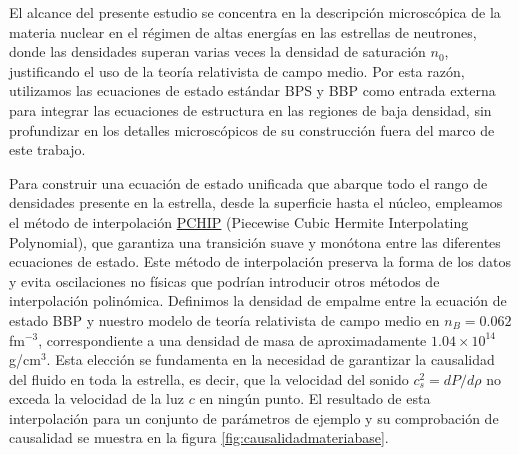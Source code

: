 El alcance del presente estudio se concentra en la descripción microscópica de la materia nuclear en el régimen de altas energías en las estrellas de neutrones, donde las densidades superan varias veces la densidad de saturación $n_0$, justificando el uso de la teoría relativista de campo medio. Por esta razón, utilizamos las ecuaciones de estado estándar BPS y BBP como entrada externa para integrar las ecuaciones de estructura en las regiones de baja densidad, sin profundizar en los detalles microscópicos de su construcción fuera del marco de este trabajo.

Para construir una ecuación de estado unificada que abarque todo el rango de densidades presente en la estrella, desde la superficie hasta el núcleo, empleamos el método de interpolación \href{https://es.wikipedia.org/wiki/Interpolador_c\%C3\%BAbico_de_Hermite}{PCHIP} (Piecewise Cubic Hermite Interpolating Polynomial), que garantiza una transición suave y monótona entre las diferentes ecuaciones de estado. Este método de interpolación preserva la forma de los datos y evita oscilaciones no físicas que podrían introducir otros métodos de interpolación polinómica. Definimos la densidad de empalme entre la ecuación de estado BBP y nuestro modelo de teoría relativista de campo medio en $n_B = 0.062$ fm$^{-3}$, correspondiente a una densidad de masa de aproximadamente $1.04 \times 10^{14}$ g/cm$^3$. Esta elección se fundamenta en la necesidad de garantizar la causalidad del fluido en toda la estrella, es decir, que la velocidad del sonido $c^2_s = dP/d\rho$ no exceda la velocidad de la luz $c$ en ningún punto. El resultado de esta interpolación para un conjunto de parámetros de ejemplo y su comprobación de causalidad se muestra en la figura \ref{fig:causalidadmateriabase}.

